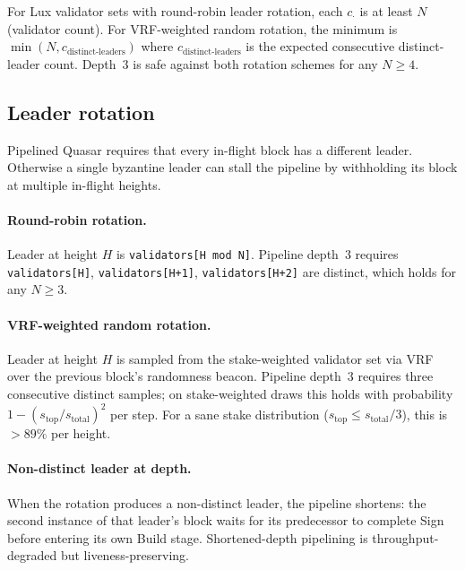 For Lux validator sets with round-robin leader rotation, each
$c_{\cdot}$ is at least $N$ (validator count). For VRF-weighted
random rotation, the minimum is $\min(N, c_{\textrm{distinct-leaders}})$
where $c_{\textrm{distinct-leaders}}$ is the expected consecutive
distinct-leader count. Depth~$3$ is safe against both rotation
schemes for any $N \geq 4$.

\subsection{Leader rotation}

Pipelined Quasar requires that every in-flight block has a
different leader. Otherwise a single byzantine leader can stall the
pipeline by withholding its block at multiple in-flight heights.

\paragraph{Round-robin rotation.} Leader at height $H$ is
\texttt{validators[H mod N]}. Pipeline depth~$3$ requires
\texttt{validators[H]}, \texttt{validators[H+1]},
\texttt{validators[H+2]} are distinct, which holds for any $N \geq 3$.

\paragraph{VRF-weighted random rotation.} Leader at height $H$ is
sampled from the stake-weighted validator set via VRF over the
previous block's randomness beacon. Pipeline depth~$3$ requires
three consecutive distinct samples; on stake-weighted draws this
holds with probability
$1 - (s_{\textrm{top}}/s_{\textrm{total}})^2$ per step. For a sane
stake distribution ($s_{\textrm{top}} \leq s_{\textrm{total}}/3$),
this is $> 89\%$ per height.

\paragraph{Non-distinct leader at depth.} When the rotation produces
a non-distinct leader, the pipeline shortens: the second instance of
that leader's block waits for its predecessor to complete Sign
before entering its own Build stage. Shortened-depth pipelining is
throughput-degraded but liveness-preserving.
